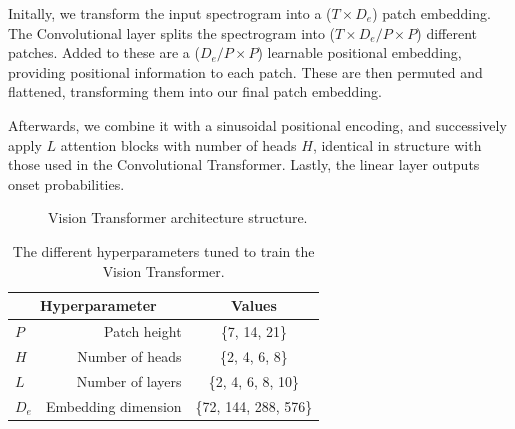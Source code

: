 Initally, we transform the input spectrogram into a ($T \times D_e$) patch embedding. The Convolutional layer splits the spectrogram into ($T \times D_e / P \times P$) different patches. Added to these are a ($D_e / P \times P$) learnable positional embedding, providing positional information to each patch. These are then permuted and flattened, transforming them into our final patch embedding.

Afterwards, we combine it with a sinusoidal positional encoding, and successively apply $L$ attention blocks with number of heads $H$, identical in structure with those used in the Convolutional Transformer. Lastly, the linear layer outputs onset probabilities.

\begin{figure}[H]
    \hspace*{-0.5cm}
    \centering
    
    \caption{Vision Transformer architecture structure.}
    \label{ViTFigure}
\end{figure}

\begin{table}[H]
    \centering
    \begin{tabular}{lr|c}
        \multicolumn{2}{c|}{Hyperparameter} & Values       \\
        \hline
        $P$ & Patch height      & \{7, 14, 21\} \\
        $H$ & Number of heads     & \{2, 4, 6, 8\} \\
        $L$ & Number of layers      & \{2, 4, 6, 8, 10\} \\
        $D_e$ & Embedding dimension      & \{72, 144, 288, 576\} \\
    \end{tabular}
    \caption{The different hyperparameters tuned to train the Vision Transformer.}
    \label{ViTHyperparams}
\end{table}